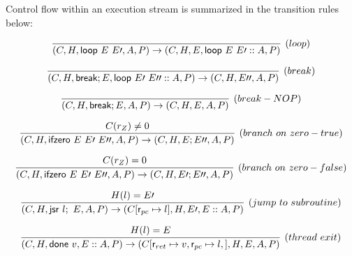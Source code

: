 \documentclass{article}
\newcommand{\sloop}[0]{\textsf{loop}}
\newcommand{\sbreak}[0]{\textsf{break}}
\newcommand{\ifz}[0]{\textsf{ifzero}}
\newcommand{\jsr}[0]{\textsf{jsr}}
\begin{document}
Control flow within an execution stream is summarized in the transition rules below:

    \begin{displaymath}
   \infer[(loop)]
    {(C, H, \sloop \ E \ E\prime, A, P) \rightarrow (C, H, E, \sloop \ E \ E\prime :: A, P)}
    {}
     \\
   \end{displaymath}
   

   \begin{displaymath}
   \infer[(break)]
    {(C, H, \sbreak; E, \sloop \ E\prime \ E\prime\prime :: A, P) \rightarrow (C, H, E\prime\prime, A, P)}
    {}
     \\
   \end{displaymath}

      \begin{displaymath}
   \infer[(break-NOP)]
    {(C, H, \sbreak; E, A, P) \rightarrow (C, H, E, A, P)}
    {}
     \\
   \end{displaymath}
   
      \begin{displaymath}
   \infer[(branch \ on \ zero-true)]
    {(C, H, \ifz \ E \ E\prime \ E\prime\prime, A, P) \rightarrow (C, H, E; E\prime\prime, A, P)}
    {C(r_{Z}) \ne 0}
     \\
   \end{displaymath}
   
   \begin{displaymath}
   \infer[(branch \ on \ zero-false)]
    {(C, H, \ifz \ E \ E\prime \ E\prime\prime, A, P) \rightarrow (C, H, E\prime; E\prime\prime, A, P)}
    {C(r_{Z}) = 0}
     \\
   \end{displaymath}
   
      \begin{displaymath}
   \infer[(jump \ to \ subroutine)]
    {(C, H, \jsr \ l; \ E, A, P) \rightarrow (C[\textsf{r$_{pc}$} \mapsto l], H, E\prime, E :: A, P)}
    {H(l) = E\prime}
     \\
   \end{displaymath}
   
    \begin{displaymath}
    \infer[(thread \ exit)]
    {(C, H, \textsf{done} \ v, E::A, P) \rightarrow (C[\textsf{r$_{ret}$} \mapsto v, \textsf{r$_{pc}$} \mapsto l, ], H, E, A, P)}
    {H(l) = E}
\\ 
\end{displaymath}
\end{document}
